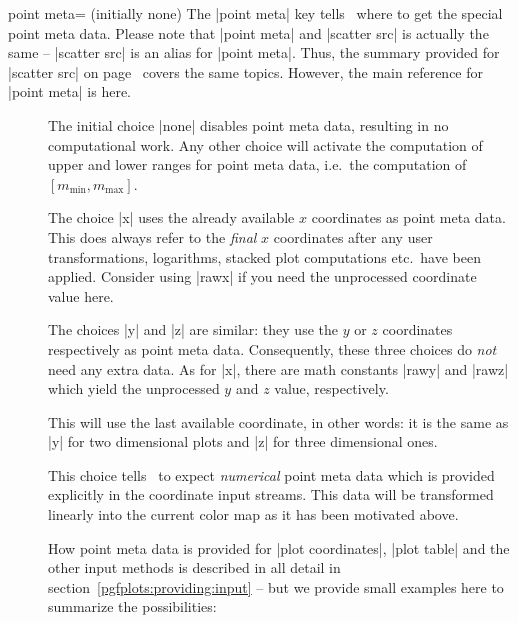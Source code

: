 \begin{pgfplotskey}{point meta= (initially none)}
	\label{pgfplots:pointmeta}
	The |point meta| key tells \PGFPlots\ where to get the special point meta data. Please note that |point meta| and |scatter src| is actually the same -- |scatter src| is an alias for |point meta|. Thus, the summary provided for |scatter src| on page~\pageref{pgfplots:scatter:src} covers the same topics. However, the main reference for |point meta| is here.
	
	\begin{description}
		\item[] The initial choice |none| disables point meta data, resulting in no computational work. Any other choice will activate the computation of upper and lower ranges for point meta data, i.e.\ the computation of $[m_{\text{min}},m_{\text{max}}]$. 

		\item[] The choice |x| uses the already available $x$ coordinates as point meta data. This does always refer to the \emph{final} $x$ coordinates after any user transformations, logarithms, stacked plot computations etc.\ have been applied. Consider using |rawx| if you need the unprocessed coordinate value here.

		\item[]
		\item[]
			 The choices |y| and |z| are similar: they use the $y$ or $z$ coordinates respectively as point meta data. Consequently, these three choices do \emph{not} need any extra data. As for |x|, there are math constants |rawy| and |rawz| which yield the unprocessed $y$ and $z$ value, respectively.

		\item[] This will use the last available coordinate, in other words: it is the same as |y| for two dimensional plots and |z| for three dimensional ones.

		\item[] This choice tells \PGFPlots\ to expect \emph{numerical} point meta data which is provided explicitly in the coordinate input streams. This data will be transformed linearly into the current color map as it has been motivated above.
		
		How point meta data is provided for |plot coordinates|, |plot table| and the other input methods is described in all detail in section~\ref{pgfplots:providing:input} -- but we provide small examples here to summarize the possibilities:
\begin{codeexample}
\end{codeexample}
\end{description}
\end{pgfplotskey}
